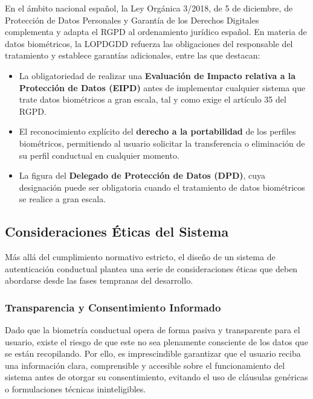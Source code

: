 En el ámbito nacional español, la Ley Orgánica 3/2018, de 5 de 
diciembre, de Protección de Datos Personales y Garantía de los Derechos 
Digitales \cite{lopdgdd2018} complementa y adapta el RGPD al 
ordenamiento jurídico español. En materia de datos biométricos, la 
LOPDGDD refuerza las obligaciones del responsable del tratamiento y 
establece garantías adicionales, entre las que destacan:
\begin{itemize}
    \item La obligatoriedad de realizar una \textbf{Evaluación de 
    Impacto relativa a la Protección de Datos (EIPD)} antes de 
    implementar cualquier sistema que trate datos biométricos a gran 
    escala, tal y como exige el artículo 35 del RGPD.

    \item El reconocimiento explícito del \textbf{derecho a la 
    portabilidad} de los perfiles biométricos, permitiendo al usuario 
    solicitar la transferencia o eliminación de su perfil conductual 
    en cualquier momento.

    \item La figura del \textbf{Delegado de Protección de Datos (DPD)}, 
    cuya designación puede ser obligatoria cuando el tratamiento de 
    datos biométricos se realice a gran escala.
\end{itemize}

\subsection{Consideraciones Éticas del Sistema}

Más allá del cumplimiento normativo estricto, el diseño de un sistema 
de autenticación conductual plantea una serie de consideraciones éticas 
que deben abordarse desde las fases tempranas del desarrollo.

\subsubsection{Transparencia y Consentimiento Informado}

Dado que la biometría conductual opera de forma pasiva y transparente 
para el usuario, existe el riesgo de que este no sea plenamente 
consciente de los datos que se están recopilando. Por ello, es 
imprescindible garantizar que el usuario reciba una información clara, 
comprensible y accesible sobre el funcionamiento del sistema antes de 
otorgar su consentimiento, evitando el uso de cláusulas genéricas o 
formulaciones técnicas ininteligibles.


